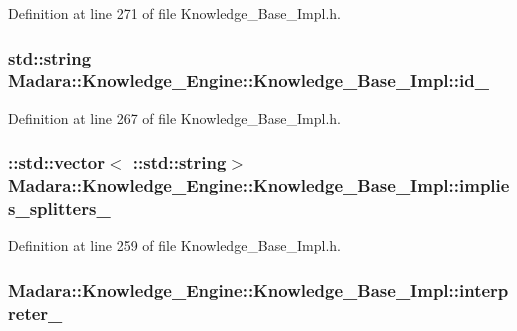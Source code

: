 Definition at line 271 of file Knowledge\_\-Base\_\-Impl.h.

\hypertarget{classMadara_1_1Knowledge__Engine_1_1Knowledge__Base__Impl_a18712c52904d45dacf9c4a7eb3f39432}{
\subsubsection[{id\_\-}]{\setlength{\rightskip}{0pt plus 5cm}std::string {\bf Madara::Knowledge\_\-Engine::Knowledge\_\-Base\_\-Impl::id\_\-}}}
\label{d3/d3c/classMadara_1_1Knowledge__Engine_1_1Knowledge__Base__Impl_a18712c52904d45dacf9c4a7eb3f39432}


Definition at line 267 of file Knowledge\_\-Base\_\-Impl.h.

\hypertarget{classMadara_1_1Knowledge__Engine_1_1Knowledge__Base__Impl_a4afdcca177b3aefd4e16b4e9a90a6f81}{
\subsubsection[{implies\_\-splitters\_\-}]{\setlength{\rightskip}{0pt plus 5cm}::std::vector$<$ ::std::string$>$ {\bf Madara::Knowledge\_\-Engine::Knowledge\_\-Base\_\-Impl::implies\_\-splitters\_\-}}}
\label{d3/d3c/classMadara_1_1Knowledge__Engine_1_1Knowledge__Base__Impl_a4afdcca177b3aefd4e16b4e9a90a6f81}


Definition at line 259 of file Knowledge\_\-Base\_\-Impl.h.

\hypertarget{classMadara_1_1Knowledge__Engine_1_1Knowledge__Base__Impl_af30b9d9180562a750c00c97fb268b7c7}{
\subsubsection[{interpreter\_\-}]{ {\bf Madara::Knowledge\_\-Engine::Knowledge\_\-Base\_\-Impl::interpreter\_\-}}}
\label{d3/d3c/classMadara_1_1Knowledge__Engine_1_1Knowledge__Base__Impl_af30b9d9180562a750c00c97fb268b7c7}


